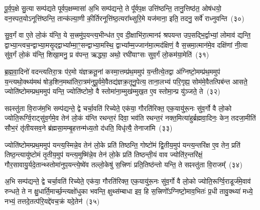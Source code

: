 पू॒र्व॒प॒क्षे सु॒त्या सम्प॑द्यते पूर्वप॒क्षम्मासा॑ अ॒भि सम्प॑द्यन्ते॒ ते पू᳚र्वप॒क्ष उत्ति॑ष्ठन्ति॒ तानु॒त्तिष्ठ॑त॒ ओष॑धयो॒ वन॒स्पत॒यो\-ऽनूत्ति॑ष्ठन्ति॒ तान्क॑ल्या॒णी की॒र्तिरनूत्ति॑ष्ठ॒त्यरा᳚थ्सुरि॒मे यज॑माना॒ इति॒ तदनु॒ सर्वे॑ राध्नुवन्ति~(३०)

{\anuvakamend[{ए॒तच्छ॒म्बट्कु॑र्वन्ति॒ तेषा॒ञ्चतु॑स्त्रिꣳशच्च}]}%

सु॒व॒र्गं वा ए॒ते लो॒कं य॑न्ति॒ ये स॒त्त्रमु॑प॒यन्त्य॒भीन्ध॑त ए॒व दी॒क्षाभि॑रा॒त्मानꣴ॑ श्रपयन्त उप॒सद्भि॒र्द्वाभ्यां॒ लोमाव॑ द्यन्ति॒ द्वाभ्या॒न्त्वच॒न्द्वाभ्या॒मसृ॒द्द्वाभ्या᳚म्मा॒ꣳ॒सन्द्वाभ्या॒मस्थि॒ द्वाभ्या᳚म्म॒ज्जान॑मा॒त्मद॑क्षिणं॒ वै स॒त्त्रमा॒त्मान॑मे॒व दक्षि॑णां नी॒त्वा सु॑व॒र्गं लो॒कं य॑न्ति॒ शिखा॒मनु॒ प्र व॑पन्त॒ ऋद्ध्या॒ अथो॒ रघी॑याꣳसः सुव॒र्गं लो॒कम॑या॒मेति॑~(३१)

{\anuvakamend[{सु॒व॒र्गम्प॑ञ्चा॒शत्}]}%

ब्र॒ह्म॒वा॒दिनो॑ वदन्त्यतिरा॒त्रः प॑र॒मो य॑ज्ञक्रतू॒नां कस्मा॒त्तम्प्र॑थ॒ममुप॑ य॒न्तीत्ये॒तद्वा अ॑ग्निष्टो॒मम्प्र॑थ॒ममुप॑ य॒न्त्यथो॒क्थ्य॑मथ॑ षोड॒शिन॒मथा॑तिरा॒त्रम॑नुपू॒र्वमे॒वैतद्य॑ज्ञक्र॒तूनु॒पेत्य॒ ताना॒लभ्य॑ परि॒गृह्य॒ सोम॑मे॒वैतत्पिब॑न्त आसते॒ ज्योति॑ष्टोमम्प्रथ॒ममुप॑ यन्ति॒ ज्योति॑ष्टोमो॒ वै स्तोमा॑ना॒म्मुख॑म्मुख॒त ए॒व स्तोमा॒न्प्र यु॑ञ्जते॒ ते~(३२)

सꣴस्तु॑ता वि॒राज॑म॒भि सम्प॑द्यन्ते॒ द्वे चर्चा॒वति॑ रिच्येते॒ एक॑या॒ गौरति॑रिक्त॒ एक॒यायु॑रू॒नः सु॑व॒र्गो वै लो॒को ज्योति॒रूर्ग्वि॒राट्सु॑व॒र्गमे॒व तेन॑ लो॒कं य॑न्ति रथन्त॒रं दिवा॒ भव॑ति रथन्त॒रं नक्त॒मित्या॑हुर्ब्रह्मवा॒दिनः॒ केन॒ तदजा॒मीति॑ सौभ॒रं तृ॑तीयसव॒ने ब्र॑ह्मसा॒मम्बृ॒हत्तन्म॑ध्य॒तो द॑धति॒ विधृ॑त्यै॒ तेनाजा॑मि~(३३)

{\anuvakamend[{त एका॒न्नप॑ञ्चा॒शच्च॑}]}%

ज्योति॑ष्टोमम्प्रथ॒ममुप॑ यन्त्य॒स्मिन्ने॒व तेन॑ लो॒के प्रति॑ तिष्ठन्ति॒ गोष्टो॑मं द्वि॒तीय॒मुप॑ यन्त्य॒न्तरि॑क्ष ए॒व तेन॒ प्रति॑ तिष्ठ॒न्त्यायु॑ष्टोमं तृ॒तीय॒मुप॑ यन्त्य॒मुष्मि॑न्ने॒व तेन॑ लो॒के प्रति॑ तिष्ठन्ती॒यं वाव ज्योति॑र॒न्तरि॑क्षं॒ गौर॒सावायु॒र्यदे॒तान्थ्स्तोमा॑नुप॒यन्त्ये॒ष्वे॑व तल्लो॒केषु॑ स॒त्त्रिणः॑ प्रति॒तिष्ठ॑न्तो यन्ति॒ ते सꣴस्तु॑ता वि॒राजम्᳚~(३४)

अ॒भि सम्प॑द्यन्ते॒ द्वे चर्चा॒वति॑ रिच्येते॒ एक॑या॒ गौरति॑रिक्त॒ एक॒यायु॑रू॒नः सु॑व॒र्गो वै लो॒को ज्योति॒रूर्ग्वि॒राडूर्ज॑मे॒वाव॑ रुन्धते॒ ते न क्षु॒धार्ति॒मार्च्छ॒न्त्यक्षो॑धुका भवन्ति॒ क्षुथ्स॑म्बाधा इव॒ हि स॒त्त्रिणो᳚\-ऽग्निष्टो॒माव॒भितः॑ प्र॒धी तावु॒क्थ्या॑ मध्ये॒ नभ्यं॒ तत्तदे॒तत्प॑रि॒यद्दे॑वच॒क्रं यदे॒तेन॑~(३५)

